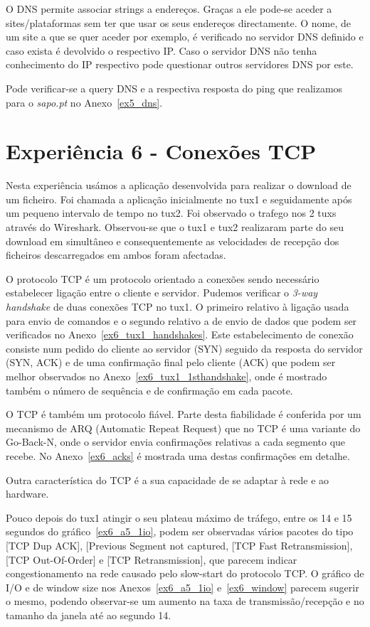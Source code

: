 \documentclass[11pt,a4paper,reqno]{report}
\numberwithin{equation}{section}
\begin{document}
O DNS permite associar strings a endereços. Graças a ele pode-se aceder a sites/plataformas sem ter que usar os seus endereços directamente. O nome, de um site a que se quer aceder por exemplo, é verificado no servidor DNS definido e caso exista é devolvido o respectivo IP. Caso o servidor DNS não tenha conhecimento do IP respectivo pode questionar outros servidores DNS por este. 

Pode verificar-se a query DNS e a respectiva resposta do ping que realizamos para o \emph{sapo.pt} no Anexo~\ref{ex5_dns}.


\section{Experiência 6 - Conexões TCP}

Nesta experiência usámos a aplicação desenvolvida para realizar o download de um ficheiro. Foi chamada a aplicação inicialmente no tux1 e seguidamente após um pequeno intervalo de tempo no tux2. Foi observado o trafego nos 2 tuxs através do Wireshark. Observou-se que o tux1 e tux2 realizaram parte do seu download em simultâneo e consequentemente as velocidades de recepção dos ficheiros descarregados em ambos foram afectadas.

O protocolo TCP é um protocolo orientado a conexões sendo necessário estabelecer ligação entre o cliente e servidor.
Pudemos verificar o \emph{3-way handshake} de duas conexões TCP no tux1. O primeiro relativo à ligação usada para envio de comandos e o segundo relativo a de envio de dados que podem ser verificados no Anexo~\ref{ex6_tux1_handshakes}. Este estabelecimento de conexão consiste num pedido do cliente ao servidor (SYN) seguido da resposta do servidor (SYN, ACK) e de uma confirmação final pelo cliente (ACK) que podem ser melhor observados no Anexo~\ref{ex6_tux1_1sthandshake}, onde é mostrado também o número de sequência e de confirmação em cada pacote. 

O TCP é também um protocolo fiável. Parte desta fiabilidade é conferida por um mecanismo de ARQ (Automatic Repeat Request) que no TCP é uma variante do Go-Back-N, onde o servidor envia confirmações relativas a cada segmento que recebe. No Anexo~\ref{ex6_acks} é mostrada uma destas confirmações em detalhe. 

Outra característica do TCP é a sua capacidade de se adaptar à rede e ao hardware.

Pouco depois do tux1 atingir o seu plateau máximo de tráfego, entre os 14 e 15 segundos do gráfico~\ref{ex6_a5_1io}, podem ser observadas vários pacotes do tipo [TCP Dup ACK], [Previous Segment not captured, [TCP Fast Retransmission], [TCP Out-Of-Order] e [TCP Retransmission], que parecem indicar congestionamento na rede causado pelo slow-start do protocolo TCP. O gráfico de I/O e de window size nos Anexos~\ref{ex6_a5_1io} e~\ref{ex6_window} parecem sugerir o mesmo, podendo observar-se um aumento na taxa de transmissão/recepção e no tamanho da janela até ao segundo 14.
\end{document}

